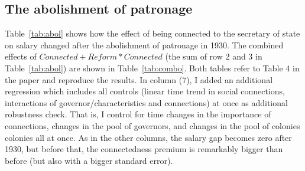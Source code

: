 \documentclass[a4paper]{article}\usepackage[]{graphicx}\usepackage[]{color}
\begin{document}
\subsection{The abolishment of patronage}
\hspace*{5mm} Table~\ref{tab:abol} shows how the effect of being connected to the secretary of state on salary changed after the abolishment of patronage in 1930. The combined effects of $Connected + Reform*Connected$ (the sum of row 2 and 3 in Table~\ref{tab:abol}) are shown in Table~\ref{tab:combo}. Both tables refer to Table 4 in the paper and reproduce the results. In column (7), I added an additional regression which includes all controls (linear time trend in social connections, interactions of governor/characteristics and connections) at once as additional robustness check. That is, I control for time changes in the importance of connections, changes in the pool of governors, and changes in the pool of colonies colonies all at once. As in the other columns, the salary gap becomes zero after 1930, but before that, the connectedness premium is remarkably bigger than before (but also with a bigger standard error). 
\end{document}
